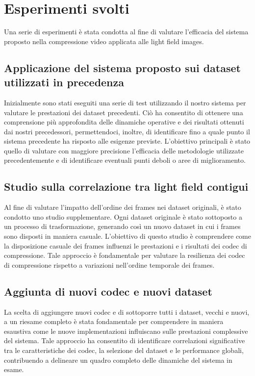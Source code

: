\chapter{Esperimenti svolti}
Una serie di esperimenti è stata condotta al fine di valutare l'efficacia del sistema proposto nella compressione video applicata alle light field images.

\section{Applicazione del sistema proposto sui dataset utilizzati in precedenza}
Inizialmente sono stati eseguiti una serie di test utilizzando il nostro sistema per valutare le prestazioni dei dataset precedenti. Ciò ha consentito di ottenere una comprensione più approfondita delle dinamiche operative e dei risultati ottenuti dai nostri precedessori, permettendoci, inoltre, di identificare fino a quale punto il sistema precedente ha risposto alle esigenze previste.
L'obiettivo principali è stato quello di valutare con maggiore precisione l'efficacia delle metodologie utilizzate precedentemente e di identificare eventuali punti deboli o aree di miglioramento. 

\section{Studio sulla correlazione tra light field contigui}
Al fine di valutare l'impatto dell'ordine dei frames nei dataset originali, è stato condotto uno studio supplementare. Ogni dataset originale è stato sottoposto a un processo di trasformazione, generando così un nuovo dataset in cui i frames sono disposti in maniera casuale. 
L'obiettivo di questo studio è comprendere come la disposizione casuale dei frames influenzi le prestazioni e i risultati dei codec di compressione. Tale approccio è fondamentale per valutare la resilienza dei codec di compressione rispetto a variazioni nell'ordine temporale dei frames. 

\section{Aggiunta di nuovi codec e nuovi dataset}
La scelta di aggiungere nuovi codec e di sottoporre tutti i dataset, vecchi e nuovi, a un riesame completo è stata fondamentale per comprendere in maniera esaustiva come le nuove implementazioni influiscano sulle prestazioni complessive del sistema. Tale approccio ha consentito di identificare correlazioni significative tra le caratteristiche dei codec, la selezione del dataset e le performance globali, contribuendo a delineare un quadro completo delle dinamiche del sistema in esame.


